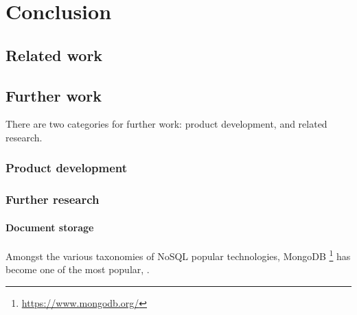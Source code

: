 \chapter{Conclusion}\label{chap:conclusion}





\cite{cummins2014pip-db}
\cite{cummins2014migrating}


\section{Related work}


\section{Further work}

There are two categories for further work: product development, and
related research.

\subsection{Product development}


\subsection{Further research}

\subsubsection*{Document storage}\label{subsec:document-storage}

Amongst the various taxonomies of NoSQL popular technologies,
MongoDB \footnote{\url{https://www.mongodb.org/}} has become one of
the most popular, \cite{tudorica2011comparison, mongo2014leading,
  hecht2011nosql, mongo2013top5}.






\cite{chodorow2013mongodb}
